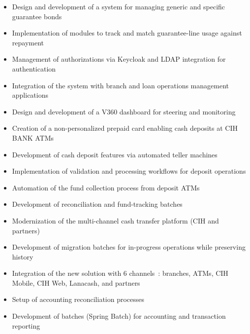 \begin{itemize}
    \item Design and development of a system for managing generic and specific guarantee bonds
    \item Implementation of modules to track and match guarantee-line usage against repayment
    \item Management of authorizations via Keycloak and LDAP integration for authentication
    \item Integration of the system with branch and loan operations management applications
    \item Design and development of a V360 dashboard for steering and monitoring
\end{itemize}

\begin{itemize}
    \item Creation of a non-personalized prepaid card enabling cash deposits at CIH BANK ATMs
    \item Development of cash deposit features via automated teller machines
    \item Implementation of validation and processing workflows for deposit operations
\end{itemize}

\begin{itemize}
    \item Automation of the fund collection process from deposit ATMs
    \item Development of reconciliation and fund-tracking batches
\end{itemize}

\begin{itemize}
    \item Modernization of the multi-channel cash transfer platform (CIH and partners)
    \item Development of migration batches for in-progress operations while preserving history
    \item Integration of the new solution with 6 channels~: branches, ATMs, CIH Mobile, CIH Web, Lanacash, and partners
\end{itemize}

\begin{itemize}
    \item Setup of accounting reconciliation processes
    \item Development of batches (Spring Batch) for accounting and transaction reporting
\end{itemize}


